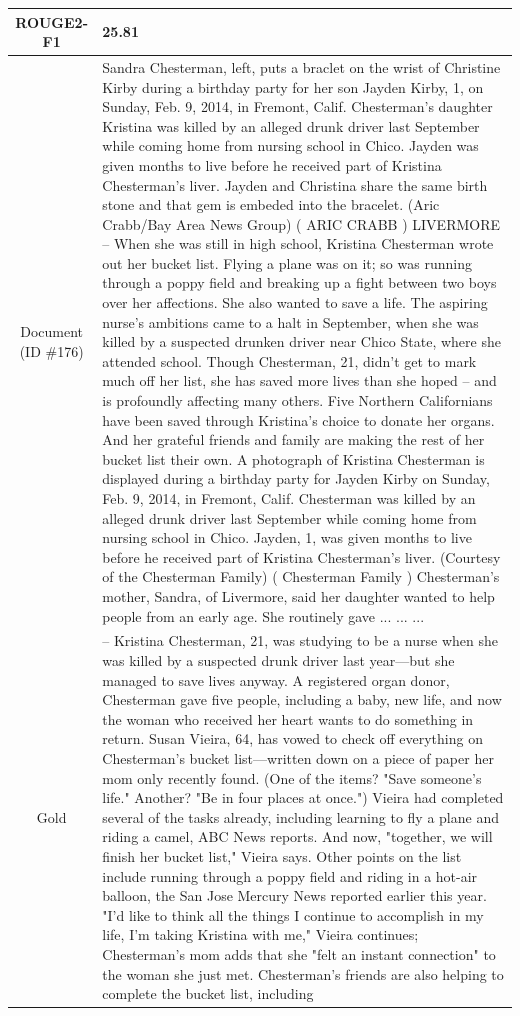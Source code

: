\begin{table}[bth!]
\begin{tabular}{c|p{}}
\\ \hline
ROUGE2-F1 & 
25.81
\\ \hline
\makecell{Document\\(ID \#176)} & 
Sandra Chesterman, left, puts a braclet on the wrist of Christine Kirby during a birthday party for her son Jayden Kirby, 1, on Sunday, Feb. 9, 2014, in Fremont, Calif. Chesterman's daughter Kristina was killed by an alleged drunk driver last September while coming home from nursing school in Chico. Jayden was given months to live before he received part of Kristina Chesterman's liver. Jayden and Christina share the same birth stone and that gem is embeded into the bracelet. (Aric Crabb/Bay Area News Group) ( ARIC CRABB ) LIVERMORE -- When she was still in high school, Kristina Chesterman wrote out her bucket list. Flying a plane was on it; so was running through a poppy field and breaking up a fight between two boys over her affections. She also wanted to save a life. The aspiring nurse's ambitions came to a halt in September, when she was killed by a suspected drunken driver near Chico State, where she attended school. Though Chesterman, 21, didn't get to mark much off her list, she has saved more lives than she hoped -- and is profoundly affecting many others. Five Northern Californians have been saved through Kristina's choice to donate her organs. And her grateful friends and family are making the rest of her bucket list their own. A photograph of Kristina Chesterman is displayed during a birthday party for Jayden Kirby on Sunday, Feb. 9, 2014, in Fremont, Calif. Chesterman was killed by an alleged drunk driver last September while coming home from nursing school in Chico. Jayden, 1, was given months to live before he received part of Kristina Chesterman's liver. (Courtesy of the Chesterman Family) ( Chesterman Family ) Chesterman's mother, Sandra, of Livermore, said her daughter wanted to help people from an early age. She routinely gave ... ... ... 
\\ \hline
Gold & 
– Kristina Chesterman, 21, was studying to be a nurse when she was killed by a suspected drunk driver last year—but she managed to save lives anyway. A registered organ donor, Chesterman gave five people, including a baby, new life, and now the woman who received her heart wants to do something in return. Susan Vieira, 64, has vowed to check off everything on Chesterman's bucket list—written down on a piece of paper her mom only recently found. (One of the items? "Save someone's life." Another? "Be in four places at once.") Vieira had completed several of the tasks already, including learning to fly a plane and riding a camel, ABC News reports. And now, "together, we will finish her bucket list," Vieira says. Other points on the list include running through a poppy field and riding in a hot-air balloon, the San Jose Mercury News reported earlier this year. "I'd like to think all the things I continue to accomplish in my life, I’m taking Kristina with me," Vieira continues; Chesterman's mom adds that she "felt an instant connection" to the woman she just met. Chesterman's friends are also helping to complete the bucket list, including

\end{tabular}
\end{table}
